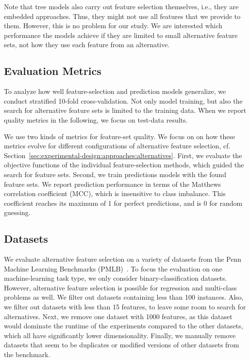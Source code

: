 \documentclass[conference]{IEEEtran}
\theoremstyle{definition}
\begin{document}
Note that tree models also carry out feature selection themselves, i.e., they are embedded approaches.
Thus, they might not use all features that we provide to them.
However, this is no problem for our study.
We are interested which performance the models achieve if they are limited to small alternative feature sets, not how they use each feature from an alternative.

\subsection{Evaluation Metrics}
\label{sec:experimental-design:evaluation}

To analyze how well feature-selection and prediction models generalize, we conduct stratified 10-fold cross-validation.
Not only model training, but also the search for alternative feature sets is limited to the training data.
When we report quality metrics in the following, we focus on test-data results.

We use two kinds of metrics for feature-set quality.
We focus on on how these metrics evolve for different configurations of alternative feature selection, cf. Section~\ref{sec:experimental-design:approaches:alternatives}.
First, we evaluate the objective functions of the individual feature-selection methods, which guided the search for feature sets.
Second, we train predictions models with the found feature sets.
We report prediction performance in terms of the Matthews correlation coefficient (MCC), which is insensitive to class imbalance.
This coefficient reaches its maximum of 1 for perfect predictions, and is 0 for random guessing.

\subsection{Datasets}
\label{sec:experimental-design:datasets}

We evaluate alternative feature selection on a variety of datasets from the Penn Machine Learning Benchmarks (PMLB)~\cite{olson2017pmlb,romano2021pmlb}.
To focus the evaluation on one machine-learning task type, we only consider binary-classification datasets.
However, alternative feature selection is possible for regression and multi-class problems as well.
We filter out datasets containing less than 100 instances.
Also, we filter out datasets with less than 15 features, to leave some room to search for alternatives.
Next, we remove one dataset with 1000 features, as this dataset would dominate the runtime of the experiments compared to the other datasets, which all have significantly lower dimensionality.
Finally, we manually remove datasets that seem to be duplicates or modified versions of other datasets from the benchmark.
\end{document}

